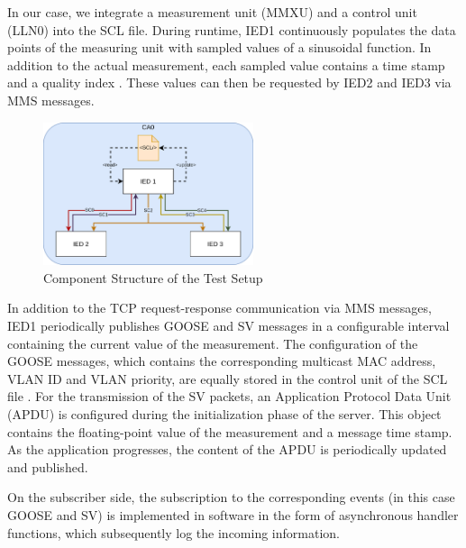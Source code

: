 \documentclass[conference, onecolumn, a4paper]{IEEEtran}
\begin{document}
\smallskip
In our case, we integrate a measurement unit (MMXU) \cite[p. 268]{IEC61850-7-4:2010} and a control unit (LLN0) \cite[p. 164]{IEC61850-7-4:2010} 
into the SCL file. During runtime, IED1 continuously populates the data points of the measuring unit with sampled values of a sinusoidal function. In 
addition to the actual measurement, each sampled value contains a time stamp and a quality index \cite[p. 61ff]{IEC61850-7-3:2010}. These values can 
then be requested by IED2 and IED3 via MMS messages.

\begin{figure}[h]
    \centering
    \includegraphics[width=0.55\textwidth]{images/TestSetupIEDs.png}
    \caption{Component Structure of the Test Setup}
    \label{image:MACsecTestSetup}
\end{figure}

\noindent In addition to the TCP request-response communication via MMS messages, IED1 periodically publishes GOOSE and SV messages in a configurable 
interval containing the current value of the measurement. The configuration of the GOOSE messages, which contains the corresponding multicast MAC address, 
VLAN ID and VLAN priority, are equally stored in the control unit of the SCL file \cite[p. 189]{IEC61850-8-1:2011}. For the transmission of the SV 
packets, an Application Protocol Data Unit (APDU) is configured during the initialization phase of the server. This object contains the floating-point 
value of the measurement and a message time stamp. As the application progresses, the content of the APDU is periodically updated and published. 

\smallskip 
On the subscriber side, the subscription to the corresponding events (in this case GOOSE and SV) is implemented in software in the form of asynchronous 
handler functions, which subsequently log the incoming information. 

\end{document}

